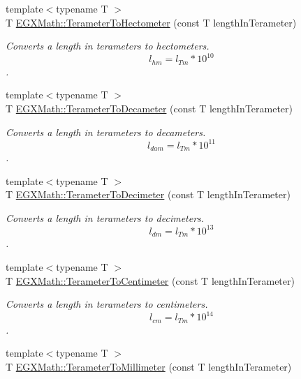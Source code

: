 \begin{DoxyCompactItemize}
{\footnotesize template$<$typename T $>$ }\\T \mbox{\hyperlink{group___e_g_x_math-_conversions-_length_conversions-_s_i-_terameter-_s_i_ga8e0944895887a45b1e2218ae7a511e4f}{E\+G\+X\+Math\+::\+Terameter\+To\+Hectometer}} (const T length\+In\+Terameter)
\begin{DoxyCompactList}\small\item\em Converts a length in terameters to hectometers. \[ l_{hm}=l_{Tm} * 10^{10} \]. \end{DoxyCompactList}\item 
{\footnotesize template$<$typename T $>$ }\\T \mbox{\hyperlink{group___e_g_x_math-_conversions-_length_conversions-_s_i-_terameter-_s_i_gae7e3fac4aa8882fee314a52fb4466fd2}{E\+G\+X\+Math\+::\+Terameter\+To\+Decameter}} (const T length\+In\+Terameter)
\begin{DoxyCompactList}\small\item\em Converts a length in terameters to decameters. \[ l_{dam}=l_{Tm} * 10^{11} \]. \end{DoxyCompactList}\item 
{\footnotesize template$<$typename T $>$ }\\T \mbox{\hyperlink{group___e_g_x_math-_conversions-_length_conversions-_s_i-_terameter-_s_i_ga988c084c9508f38112e2e39ed74782d5}{E\+G\+X\+Math\+::\+Terameter\+To\+Decimeter}} (const T length\+In\+Terameter)
\begin{DoxyCompactList}\small\item\em Converts a length in terameters to decimeters. \[ l_{dm}=l_{Tm} * 10^{13} \]. \end{DoxyCompactList}\item 
{\footnotesize template$<$typename T $>$ }\\T \mbox{\hyperlink{group___e_g_x_math-_conversions-_length_conversions-_s_i-_terameter-_s_i_gad280a7bb7ff83217a496db8168c27ee9}{E\+G\+X\+Math\+::\+Terameter\+To\+Centimeter}} (const T length\+In\+Terameter)
\begin{DoxyCompactList}\small\item\em Converts a length in terameters to centimeters. \[ l_{cm}=l_{Tm} * 10^{14} \]. \end{DoxyCompactList}\item 
{\footnotesize template$<$typename T $>$ }\\T \mbox{\hyperlink{group___e_g_x_math-_conversions-_length_conversions-_s_i-_terameter-_s_i_gaff9d9c2af8681eacbb3d5d01cb9f9cfa}{E\+G\+X\+Math\+::\+Terameter\+To\+Millimeter}} (const T length\+In\+Terameter)

\end{DoxyCompactItemize}
